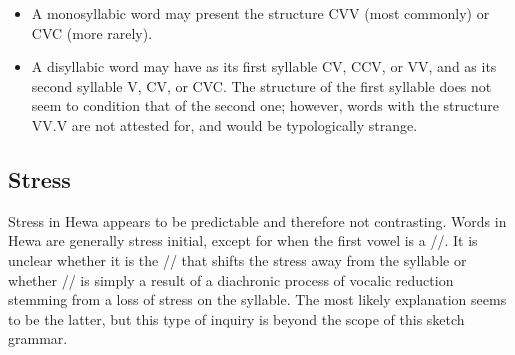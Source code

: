 \documentclass[subpreambles=true]{standalone}
\begin{document}
\begin{itemize}

\item A monosyllabic word may present the structure CVV (most commonly) or CVC (more rarely).

\item A disyllabic word may have as its first syllable CV, CCV, or VV, and as its second syllable V, CV, or CVC. The structure of the first syllable does not seem to condition that of the second one; however, words with the structure VV.V are not attested for, and would be typologically strange.

\end{itemize}


\subsection{Stress}\label{sec:str}


Stress in Hewa appears to be predictable and therefore not contrasting. Words in Hewa are generally stress initial, except for when the first vowel is a /\textschwa/. It is unclear whether it is the /\textschwa/ that shifts the stress away from the syllable or whether /\textschwa/ is simply a result of a diachronic process of vocalic reduction stemming from a loss of stress on the syllable. The most likely explanation seems to be the latter, but this type of inquiry is beyond the scope of this sketch grammar.
\end{document}
